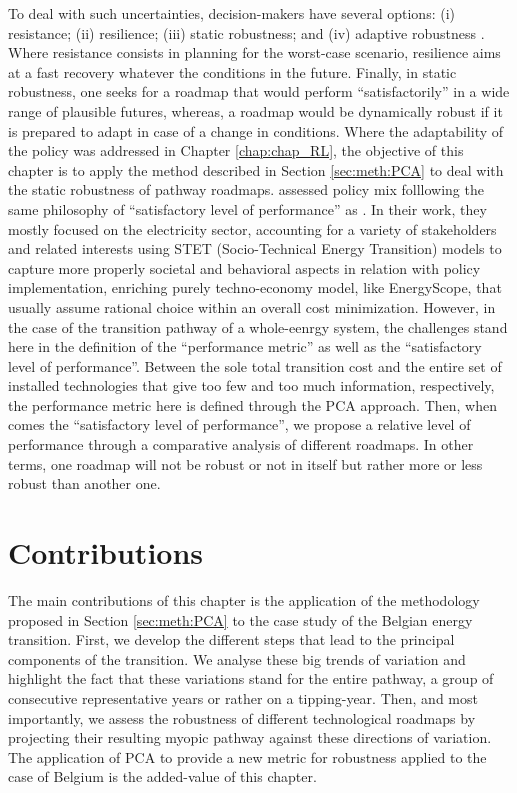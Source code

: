 To deal with such uncertainties, decision-makers have several options: (i) resistance; (ii) resilience; (iii) static robustness; and (iv) adaptive robustness \cite{walker2012deep}. Where resistance consists in planning for the worst-case scenario, resilience aims at a fast recovery whatever the conditions in the future. Finally, in static robustness, one seeks for a roadmap that would perform ``satisfactorily'' in a wide range of plausible futures, whereas, a roadmap would be dynamically robust if it is prepared to adapt in case of a change in conditions. Where the adaptability of the policy was addressed in Chapter \ref{chap:chap_RL}, the objective of this chapter is to apply the method described in Section \ref{sec:meth:PCA} to deal with the static robustness of pathway roadmaps.  \citet{castrejon2020making} assessed policy mix folllowing the same philosophy of ``satisfactory level of performance'' as \cite{walker2012deep}. In their work, they mostly focused on the electricity sector, accounting for a variety of stakeholders and related interests using STET (Socio-Technical Energy Transition) models to capture more properly societal and behavioral aspects in relation with policy implementation, enriching purely techno-economy model, like EnergyScope, that usually assume rational choice within an overall cost minimization.  However, in the case of the transition pathway of a whole-eenrgy system, the challenges stand here in the definition of the ``performance metric'' as well as the ``satisfactory level of performance''. Between the sole total transition cost and the entire set of installed technologies that give too few and too much information, respectively, the performance metric here is defined through the \gls{PCA} approach. Then, when comes the ``satisfactory level of performance'', we propose a relative level of performance through a comparative analysis of different roadmaps. In other terms, one roadmap will not be robust or not in itself but rather more or less robust than another one. 

\section*{Contributions}
\label{sec:RobPol:contributions}
The main contributions of this chapter is the application of the methodology proposed in Section \ref{sec:meth:PCA} to the case study of the Belgian energy transition. First, we develop the different steps that lead to the principal components of the transition. We analyse these big trends of variation and highlight the fact that these variations stand for the entire pathway, a group of consecutive representative years or rather on a tipping-year. Then, and most importantly, we assess the robustness of different technological roadmaps by projecting their resulting myopic pathway against these directions of variation. The application of \gls{PCA} to provide a new metric for robustness applied to the case of Belgium is the added-value of this chapter.

